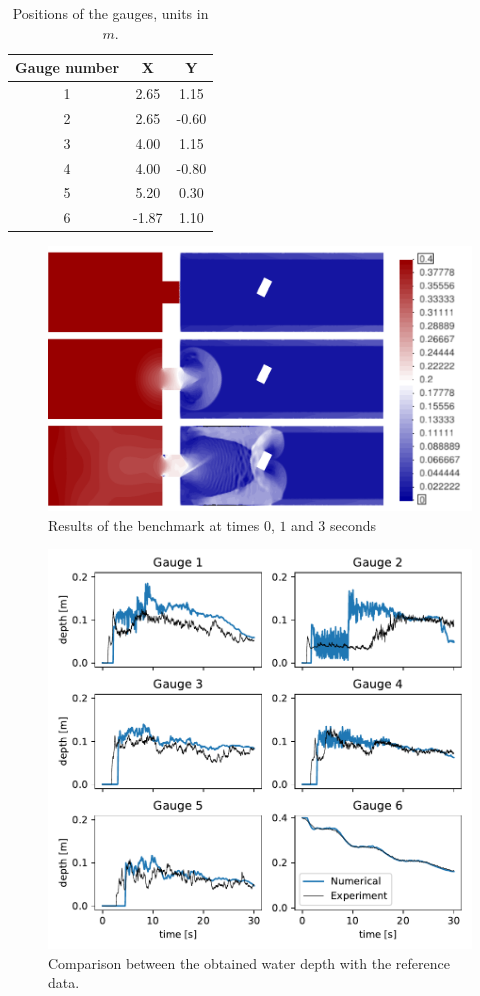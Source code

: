 \documentclass[a4paper,12pt]{article}
\begin{document}
\begin{table}
\centering
\begin{tabular}{ccc}
\hline
Gauge number & X & Y \\ \hline
1 &  2.65 &  1.15 \\
2 &  2.65 & -0.60 \\
3 &  4.00 &  1.15 \\
4 &  4.00 & -0.80 \\
5 &  5.20 &  0.30 \\
6 & -1.87 &  1.10 \\ \hline
\end{tabular}
\caption{Positions of the gauges, units in $m$.}
\label{gauges_positions}
\end{table}


\begin{figure}
\centering
\includegraphics[width=\textwidth]{img/exp/results.png}
\caption{Results of the benchmark at times $0$, $1$ and $3$ seconds}
\label{experiment_plots}
\end{figure}


\begin{figure}
\centering
\includegraphics[width=\textwidth]{img/exp/gauges.pdf}
\caption{Comparison between the obtained water depth with the reference data.}
\label{experiment_gauges}
\end{figure}
\end{document}
